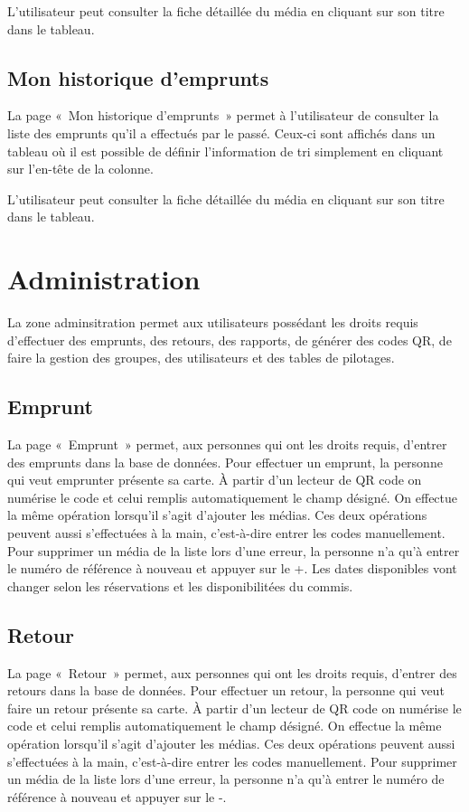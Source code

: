 \documentclass[letter, 11pt]{report}
\begin{document}
L'utilisateur peut consulter la fiche détaillée du média en cliquant sur son titre dans le tableau.

\subsection{Mon historique d'emprunts}

La page «~Mon historique d'emprunts~» permet à l'utilisateur de consulter la liste des emprunts qu'il a effectués par le passé. Ceux-ci sont affichés dans un tableau où il est possible de définir l'information de tri simplement en cliquant sur l'en-tête de la colonne.

L'utilisateur peut consulter la fiche détaillée du média en cliquant sur son titre dans le tableau.

\section{Administration}
La zone adminsitration permet aux utilisateurs possédant les droits requis d'effectuer des emprunts, des retours, des rapports, de générer des codes QR, de faire la gestion des groupes, des utilisateurs et des tables de pilotages.

\subsection{Emprunt}
La page «~Emprunt~» permet, aux personnes qui ont les droits requis, d'entrer des emprunts dans la base de données. Pour effectuer un emprunt, la personne qui veut emprunter présente sa carte. À partir d'un lecteur de QR code on numérise le code et celui remplis automatiquement le champ désigné. On effectue la même opération lorsqu'il s'agit d'ajouter les médias. Ces deux opérations peuvent aussi s'effectuées à la main, c'est-à-dire entrer les codes manuellement. Pour supprimer un média de la liste lors d'une erreur, la personne n'a qu'à entrer le numéro de référence à nouveau et appuyer sur le +. Les dates disponibles vont changer selon les réservations et les disponibilitées du commis.

\subsection{Retour}
La page «~Retour~» permet, aux personnes qui ont les droits requis, d'entrer des retours dans la base de données. Pour effectuer un retour, la personne qui veut faire un retour présente sa carte. À partir d'un lecteur de QR code on numérise le code et celui remplis automatiquement le champ désigné. On effectue la même opération lorsqu'il s'agit d'ajouter les médias. Ces deux opérations peuvent aussi s'effectuées à la main, c'est-à-dire entrer les codes manuellement. Pour supprimer un média de la liste lors d'une erreur, la personne n'a qu'à entrer le numéro de référence à nouveau et appuyer sur le -.
\end{document}
